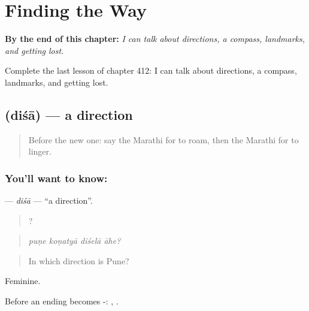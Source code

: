 
\chapter{Finding the Way}
\label{ch:mr-finding-the-way}

\begin{chapteropening}
\textbf{By the end of this chapter:} \emph{I can talk about directions, a compass, landmarks, and getting lost.}

Complete the last lesson of chapter 412: I can talk about directions, a compass, landmarks, and getting lost.
\end{chapteropening}

\section[\texorpdfstring{\mr{दिशा} (diśā)}{दिशा (diśā)}]{ (diśā) — a direction}

\label{lesson:MR-C412-disa}



\begin{quote}
Before the new one: say the Marathi for to roam, then the Marathi for to linger.
\end{quote}

\subsection*{You'll want to know: }
\textbf{} — \emph{diśā} — \textquotedblleft{}a direction\textquotedblright{}.

\begin{quote}
   ?
\end{quote}

\begin{quote}
\emph{puṇe koṇatyā diśelā āhe?}
\end{quote}

\begin{quote}
In which direction is Pune?
\end{quote}

Feminine.

Before an ending  becomes -: , .


